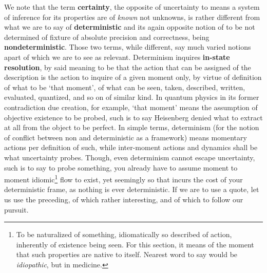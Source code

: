 We note that the term \textbf{certainty}, the opposite of uncertainty to means a system of inference for its properties are of \textit{known} not unknowns, is rather different from what we are to say of \textbf{deterministic} and its again opposite notion of to be not determined of fixture of absolute precision and correctness, being \textbf{nondeterministic}. Those two terms, while different, say much varied notions apart of which we are to see as relevant. Determinism inquires \textbf{in-state resolution}, by said meaning to be that the action that can be assigned of the description is the action to inquire of a given moment only, by virtue of definition of what to be `that moment', of what can be seen, taken, described, written, evaluated, quantized, and so on of similar kind. In quantum physics in its former contradiction due creation, for example, `that moment' means the assumption of objective existence to be probed, such is to say Heisenberg denied what to extract at all from the object to be perfect. In simple terms, determinism (for the notion of conflict between non and deterministic as a framework) means momentary actions per definition of such, while inter-moment actions and dynamics shall be what uncertainty probes. Though, even determinism cannot escape uncertainty, such is to say to probe something, you already have to assume moment to moment idiomic\footnote{To be naturalized of something, idiomatically so described of action, inherently of existence being seen. For this section, it means of the moment that such properties are native to itself. Nearest word to say would be \textit{idiopathic}, but in medicine.} flow to exist, yet seemingly so that incurs the cost of your deterministic frame, as nothing is ever deterministic. If we are to use a quote, let us use the preceding, of which rather interesting, and of which to follow our pursuit. 

